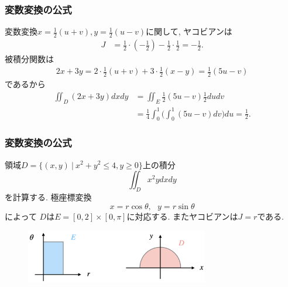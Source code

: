 


\begin{frame}
\frametitle{変数変換の公式}

変数変換$x=\frac{1}{2}(u+v), y=\frac{1}{2}(u-v)$に関して, ヤコビアンは
\begin{align*}
J & = \frac{1}{2}\cdot (-\frac{1}{2})-\frac{1}{2} \cdot \frac{1}{2}=-\frac{1}{2}. 
\end{align*}
被積分関数は
\begin{align*}
2x+3y = 2 \cdot \frac{1}{2}(u+v)+3 \cdot \frac{1}{2}(x-y) = \frac{1}{2}(5u-v)
\end{align*}
であるから
\begin{align*}
\iint_D (2x+3y)dxdy & = \iint_E  \frac{1}{2}(5u-v) \frac{1}{2}dudv \\
& = \frac{1}{4} \int_0^1\big( \int_0^1 (5u-v)dv\big)du=\frac{1}{2}.  
\end{align*}
\end{frame}






\begin{frame}
\frametitle{変数変換の公式}

領域$D=\{(x,y) \ | \ x^2+y^2 \le 4, y \ge 0\}$上の積分
$$
\iint_D x^2y dxdy
$$
を計算する. 
極座標変換
$$
x=r\cos \theta, \ \ \ y=r \sin \theta
$$
によって
$D$は$E=[0,2] \times [0,\pi]$に対応する. 
またヤコビアンは$J=r$である. 


\begin{figure}[htbp]
 \begin{center} 
  \includegraphics[width=80mm]{calculus13/polar_coord2.png}
 \end{center}
\end{figure}

\end{frame}


